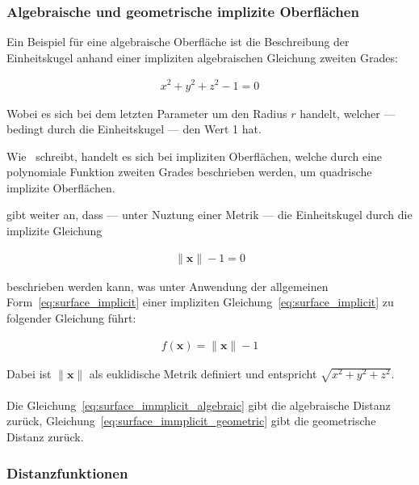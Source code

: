 \subsubsection{Algebraische und geometrische implizite Oberflächen}
\label{ssubsec:implicit_surfaces_algebraic_geometric}

Ein Beispiel für eine algebraische Oberfläche ist die Beschreibung der
Einheitskugel anhand einer impliziten algebraischen Gleichung zweiten Grades:

\begin{gather} \label{eq:surface_immplicit_algebraic}
    x^{2} + y^{2} + z^{2} - 1 = 0
\end{gather}

Wobei es sich bei dem letzten Parameter um den Radius $r$ handelt, welcher ---
bedingt durch die Einheitskugel --- den Wert 1 hat.

Wie~\cite{division_introduction_1996} schreibt, handelt es sich bei impliziten
Oberflächen, welche durch eine polynomiale Funktion zweiten Grades beschrieben
werden, um quadrische implizite Oberflächen.

\cite{hart_sphere_1994} gibt weiter an, dass --- unter Nuztung einer Metrik ---
die Einheitskugel durch die implizite Gleichung

\begin{gather} \label{eq:surface_immplicit_geometric}
    \|\bm{x}\| - 1 = 0
\end{gather}

beschrieben werden kann, was unter Anwendung der allgemeinen
Form~\ref{eq:surface_implicit} einer impliziten
Gleichung~\ref{eq:surface_implicit} zu folgender Gleichung führt:

\begin{gather}\label{eq:surface_implicit_sphere}
    f(\bm{x}) = \|\bm{x}\| - 1
\end{gather}


Dabei ist $\|\bm{x}\|$ als euklidische Metrik definiert und entspricht $\sqrt{x^{2} + y^{2} + z^{2}}$.\\
\\
Die Gleichung~\ref{eq:surface_immplicit_algebraic} gibt die algebraische
Distanz zurück, Gleichung~\ref{eq:surface_immplicit_geometric} gibt die
geometrische Distanz zurück.\\

\subsubsection{Distanzfunktionen}
\label{ssubsec:distance_functions}

